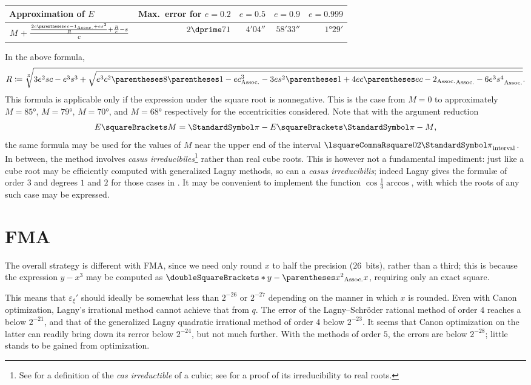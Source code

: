 ﻿\documentclass[10pt, a4paper, twoside]{basestyle}
\newcommand{\round}[1]{\doubleSquareBrackets*{#1}}
\begin{document}
\begin{center}
\begin{tabular}{lrrrr}
Approximation of $E$ & Max.~error for $e=0.2$ & $e=0.5$ & $e=0.9$ & $e=0.999$ \\
\hline
$M+\frac{\frac{2c\pa{ec-1}+es^2}{R}+\frac{R}{e}-s}{c}$
 & $2\dprime\llap.71$ & $4'04\dprime$ & $58'33\dprime$& $1°29'$
\end{tabular}
\end{center}
In the above formula,\[
R\DefineAs\sqrt[3]{3e^2sc-e^3s^3+\sqrt{e^3c^2\pa{8\pa{1-ec}^3-3es^2\pa{1+4ec\pa{ec-2}}-6e^3s^4}}}\text.
\]
This formula is applicable only if the expression under the square root is nonnegative.
This is the case from $M=0$ to approximately $M=85°$, $M=79°$, $M=70°$, and $M=68°$
respectively for the eccentricities considered. Note that with the argument reduction\[
E\of{M}=\Pi-E\of{\Pi-M}\text,\]
the same formula may be used for the values of $M$ near the upper end of the interval $\intclos{0}{2\Pi}$.
In between, the method involves 
\emph{casus irreducibiles}\footnote{See \cite[469]{FantetdeLagny1697} for a definition
of the \emph{cas irreductible} of a cubic; see \cite[125\psqq]{Wantzel1843} for a proof of its irreducibility to real
roots.} rather than real cube roots.
This is however not a fundamental impediment: just like a cube root may be efficiently computed with generalized Lagny
methods, so can a \emph{casus irreducibilis}; indeed Lagny gives the formulæ of order $3$ and degrees $1$ and $2$ for those
cases in \cite[41]{FantetdeLagny1692}. It may be convenient to implement the function
$\cos\frac{1}{3}\arccos$, with which the roots of any such case may be expressed.

\section{FMA}
\label{FMA}
The overall strategy is different with FMA, since we need only round $x$ to half the precision ($26$~bits),
rather than a third; this is because the expression $y-x^3$ may be computed as $\round{y-\pa{x^2}x}$,
requiring only an exact square.

This means that $ε_ξ'$ should ideally be somewhat less than $2^{-26}$ or $2^{-27}$ depending on
the manner in which $x$ is rounded. Even with Canon optimization, Lagny's irrational method cannot
achieve that from $q$. The error of the Lagny--Schröder rational method of order $4$ reaches a below $2^{-21}$,
and that of the generalized Lagny quadratic irrational method of order $4$ below $2^{-23}$.
It seems that Canon optimization on the latter can readily bring down its rerror below $2^{-24}$, but not much
further.
With the methods of order $5$, the errors are below $2^{-28}$; little stands to be gained from optimization.
\end{document}

